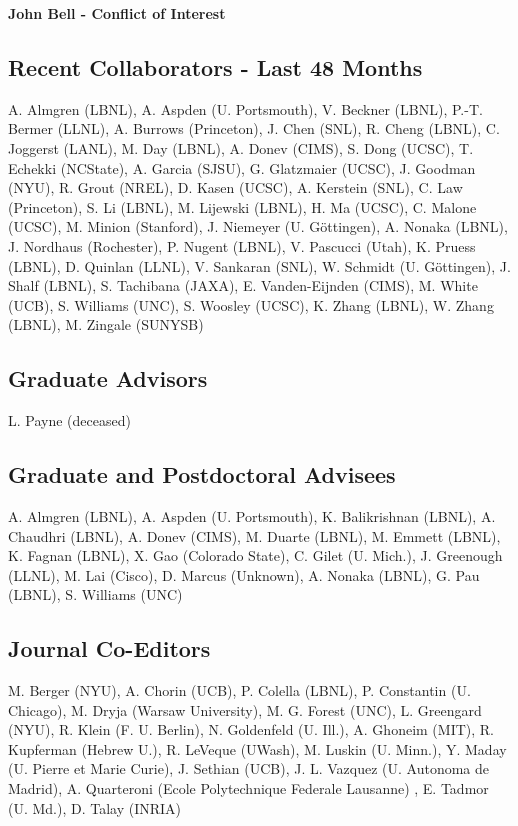 \documentclass[11pt]{article}
\begin{document}
\begin{center}
{\Large{\textbf{John Bell - Conflict of Interest}}}
\end{center}

\subsection*{Recent Collaborators - Last 48 Months}
A. Almgren (LBNL), A. Aspden (U. Portsmouth), V. Beckner (LBNL), P.-T. Bermer (LLNL),
A. Burrows (Princeton),
J. Chen (SNL), 
R. Cheng (LBNL), C. Joggerst (LANL), 
M. Day (LBNL), A. Donev (CIMS), S. Dong (UCSC), T. Echekki (NCState),
A. Garcia (SJSU), G. Glatzmaier (UCSC), J. Goodman (NYU), R. Grout (NREL),
D. Kasen (UCSC), A. Kerstein (SNL), C. Law (Princeton), S. Li (LBNL), M. Lijewski (LBNL),
H. Ma (UCSC), C. Malone (UCSC), M. Minion (Stanford), J. Niemeyer (U. G\"{o}ttingen), 
A. Nonaka (LBNL), J. Nordhaus (Rochester), P. Nugent (LBNL), V. Pascucci (Utah), K. Pruess (LBNL),
D. Quinlan (LLNL),
V. Sankaran (SNL), W. Schmidt (U. G\"{o}ttingen),
J. Shalf (LBNL),
S. Tachibana (JAXA), E. Vanden-Eijnden (CIMS),  M. White (UCB),
S. Williams (UNC), S. Woosley (UCSC), K. Zhang (LBNL), W. Zhang (LBNL), M. Zingale (SUNYSB)

\subsection*{Graduate Advisors}
L. Payne (deceased)

\subsection*{Graduate and Postdoctoral Advisees}
A. Almgren (LBNL), A. Aspden (U. Portsmouth), K. Balikrishnan (LBNL), A. Chaudhri (LBNL),
A. Donev (CIMS), M. Duarte (LBNL), M. Emmett (LBNL), K. Fagnan (LBNL), X. Gao (Colorado State),
C. Gilet (U. Mich.),
J. Greenough (LLNL), M. Lai (Cisco), D. Marcus (Unknown),
A. Nonaka (LBNL), G. Pau (LBNL), S. Williams (UNC)

\subsection*{Journal Co-Editors}
M. Berger (NYU), A. Chorin (UCB), P. Colella (LBNL), P. Constantin (U. Chicago),
M. Dryja (Warsaw University),
M. G. Forest (UNC), L. Greengard (NYU),
R. Klein (F. U. Berlin), N. Goldenfeld (U. Ill.), A. Ghoneim (MIT), R. Kupferman (Hebrew U.), R. LeVeque (UWash),
M. Luskin (U. Minn.), Y. Maday (U. Pierre et Marie Curie), J. Sethian (UCB), J. L. Vazquez (U. Autonoma de Madrid),
A. Quarteroni (Ecole Polytechnique Federale Lausanne) , E. Tadmor (U. Md.), D. Talay (INRIA)
\end{document}
